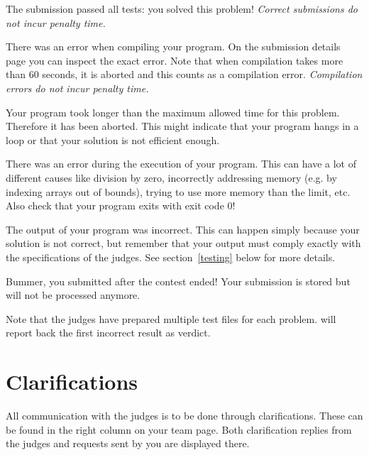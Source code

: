 \begin{description}[\setleftmargin{4.5cm}]
\item[CORRECT]
The submission passed all tests: you solved this problem!
\textit{Correct submissions do not incur penalty time.}

\item[COMPILER-ERROR]
There was an error when compiling your program. On the submission
details page you can inspect the exact error. Note that when
compilation takes more than 60 seconds, it is aborted and
this counts as a compilation error.
\textit{Compilation errors do not incur penalty time.}

\item[TIMELIMIT]
Your program took longer than the maximum allowed time for this
problem. Therefore it has been aborted. This might indicate that your
program hangs in a loop or that your solution is not efficient
enough.

\item[RUN-ERROR]
There was an error during the execution of your program. This can have
a lot of different causes like division by zero, incorrectly
addressing memory (e.g. by indexing arrays out of bounds), trying to
use more memory than the limit, etc.
Also check that your program exits with exit code 0!

\item[WRONG-ANSWER]
The output of your program was incorrect. This can happen simply
because your solution is not correct, but remember that your output
must comply exactly with the specifications of the judges. See
section~\ref{testing} below for more details.

\item[TOO-LATE]
Bummer, you submitted after the contest ended! Your submission is
stored but will not be processed anymore.
\end{description}

Note that the judges have prepared multiple test files for each problem. \DOMjudge
will report back the first incorrect result as verdict.

\section{Clarifications}

All communication with the judges is to be done through clarifications.
These can be found in the right column on your team page. Both
clarification replies from the judges and requests sent by you
are displayed there.


